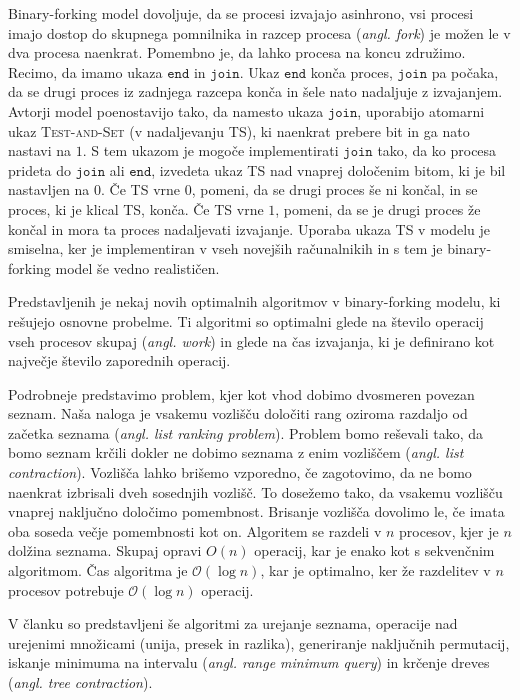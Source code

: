 \documentclass[a4paper,11pt]{article}
\begin{document}
Binary-forking model dovoljuje, da se procesi izvajajo asinhrono, vsi procesi imajo dostop do skupnega pomnilnika in razcep procesa (\textit{angl. fork}) je možen le v dva procesa naenkrat. 
Pomembno je, da lahko procesa na koncu združimo. 
Recimo, da imamo ukaza $\texttt{end}$ in $\texttt{join}$. 
Ukaz $\texttt{end}$ konča proces, $\texttt{join}$ pa počaka, da se drugi proces iz zadnjega razcepa konča in šele nato nadaljuje z izvajanjem. 
Avtorji model poenostavijo tako, da namesto ukaza $\texttt{join}$, uporabijo atomarni ukaz \textsc{Test-and-Set} (v nadaljevanju TS), ki naenkrat prebere bit in ga nato nastavi na $1$. 
S tem ukazom je mogoče implementirati $\texttt{join}$ tako, da ko procesa prideta do $\texttt{join}$ ali $\texttt{end}$, izvedeta ukaz TS nad vnaprej določenim bitom, ki je bil nastavljen na $0$. 
Če TS vrne $0$, pomeni, da se drugi proces še ni končal, in se proces, ki je klical TS, konča. 
Če TS vrne $1$, pomeni, da se je drugi proces že končal in mora ta proces nadaljevati izvajanje. 
Uporaba ukaza TS v modelu je smiselna, ker je implementiran v vseh novejših računalnikih in s tem je binary-forking model še vedno realističen.

Predstavljenih je nekaj novih optimalnih algoritmov v binary-forking modelu, ki rešujejo osnovne probelme. 
Ti algoritmi so optimalni glede na število operacij vseh procesov skupaj (\textit{angl. work}) in glede na čas izvajanja, ki je definirano kot največje število zaporednih operacij.

Podrobneje predstavimo problem, kjer kot vhod dobimo dvosmeren povezan seznam. 
Naša naloga je vsakemu vozlišču določiti rang oziroma razdaljo od začetka seznama (\textit{angl. list ranking problem}). 
Problem bomo reševali tako, da bomo seznam krčili dokler ne dobimo seznama z enim vozliščem (\textit{angl. list contraction}). 
Vozlišča lahko brišemo vzporedno, če zagotovimo, da ne bomo naenkrat izbrisali dveh sosednjih vozlišč. 
To dosežemo tako, da vsakemu vozlišču vnaprej naključno določimo pomembnost. 
Brisanje vozlišča dovolimo le, če imata oba soseda večje pomembnosti kot on. 
Algoritem se razdeli v $n$ procesov, kjer je $n$ dolžina seznama. 
Skupaj opravi $O(n)$ operacij, kar je enako kot s sekvenčnim algoritmom. Čas algoritma je $\mathcal{O}(\log n)$, kar je optimalno, ker že razdelitev v $n$ procesov potrebuje $\mathcal{O}(\log n)$ operacij.

V članku so predstavljeni še algoritmi za urejanje seznama, operacije nad urejenimi množicami (unija, presek in razlika), generiranje naključnih permutacij, iskanje minimuma na intervalu (\textit{angl. range minimum query}) in krčenje dreves (\textit{angl. tree contraction}).
\end{document}
